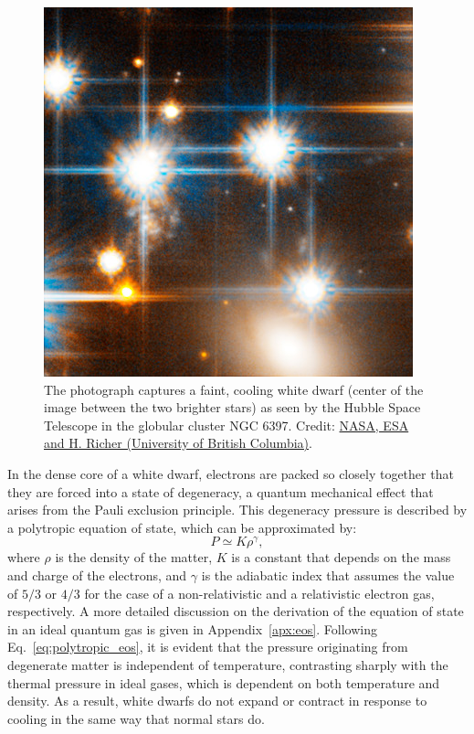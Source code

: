 \documentclass[main.tex]{subfiles}
\begin{document}
    \begin{figure}[th!]
        \centering
        \includegraphics[scale=0.6]{figures/chapter1/wd_ngc6397.jpeg}
        \caption{The photograph captures a faint, cooling white dwarf (center of the image between the two brighter stars) as seen by the Hubble Space Telescope in the globular cluster NGC 6397. Credit: \href{https://esahubble.org/images/heic0608c/}{NASA, ESA and H. Richer (University of British Columbia)}.}
        \label{fig:wd_ngc6397}
    \end{figure}
    
    In the dense core of a white dwarf, electrons are packed so closely together that they are forced into a state of degeneracy, a quantum mechanical effect that arises from the Pauli exclusion principle. This degeneracy pressure is described by a polytropic equation of state, which can be approximated by:
    \begin{equation}\label{eq:polytropic_eos}
        P \simeq K \rho^\gamma,
    \end{equation}
    where $\rho$ is the density of the matter, $K$  is a constant that depends on the mass and charge of the electrons, and $\gamma$ is the adiabatic index that assumes the value of $5/3$ or $4/3$ for the case of a non-relativistic and a relativistic electron gas, respectively. A more detailed discussion on the derivation of the equation of state in an ideal quantum gas is given in Appendix~\ref{apx:eos}.
    Following Eq.~\eqref{eq:polytropic_eos}, it is evident that the pressure originating from degenerate matter is independent of temperature, contrasting sharply with the thermal pressure in ideal gases, which is dependent on both temperature and density. As a result, white dwarfs do not expand or contract in response to cooling in the same way that normal stars do.
\end{document}
